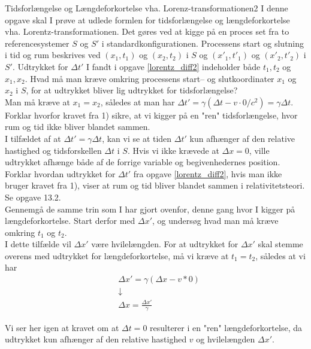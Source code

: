 \begin{opgave}{Tidsforlængelse og Længdeforkortelse vha. Lorenz-transformationen}{2}
	I denne opgave skal I prøve at udlede formlen for tidsforlængelse og længdeforkortelse vha. Lorentz-transformationen. Det gøres ved at kigge på en proces set fra to referencesystemer $S$ og $S'$ i standardkonfigurationen. Processens start og slutning i tid og rum beskrives ved $(x_1,t_1)$ og $(x_2,t_2)$ i $S$ og $(x'_1,t'_1)$ og $(x'_2,t'_2)$ i $S'$.
	\opg Udtrykket for $\Delta t'$ I fandt i opgave \ref{lorentz_diff2} indeholder både $t_1,t_2$ og $x_1,x_2$. Hvad må man kræve omkring processens start-- og slutkoordinater $x_1$ og $x_2$ i $S$, for at udtrykket bliver lig udtrykket for tidsforlængelse?\\
	
	Man må kræve at $x_1=x_2$, således at man har $\Delta t'=\gamma(\Delta t-v \cdot 0/c^2)=\gamma\Delta t$.\\
	\opg Forklar hvorfor kravet fra 1) sikre, at vi kigger på en "ren" tidsforlængelse, hvor rum og tid ikke bliver blandet sammen.\\
	
	I tilfældet af at $\Delta t' =\gamma\Delta t$, kan vi se at tiden $\Delta t'$ kun afhænger af den relative hastighed og tidsforskellen $\Delta t$ i $S$. Hvis vi ikke krævede at $\Delta x=0$, ville udtrykket afhænge både af de forrige variable og begivenhedernes position.\\
	\opg Forklar hvordan udtrykket for $\Delta t'$ fra opgave \ref{lorentz_diff2}, hvis man ikke bruger kravet fra 1), viser at rum og tid bliver blandet sammen i relativitetsteori.\\
	
	Se opgave 13.2.\\
	\opg Gennemgå de samme trin som I har gjort ovenfor, denne gang hvor I kigger på længdeforkortelse. Start derfor med $\Delta x'$, og undersøg hvad man må kræve omkring $t_1$ og $t_2$.\\
	
	I dette tilfælde vil $\Delta x'$ være hvilelængden. For at udtrykket for $\Delta x'$ skal stemme overens med udtrykket for længdeforkortelse, må vi kræve at $t_1=t_2$, således at vi har
	\begin{align*}
	&\Delta x'=\gamma(\Delta x-v*0) \\
	&\downarrow \\
	&\Delta x=\frac{\Delta x'}{\gamma}
	\end{align*}
	
	Vi ser her igen at kravet om at $\Delta t = 0$ resulterer i en "ren" længdeforkortelse, da udtrykket kun afhænger af den relative hastighed $v$ og hvilelængden $\Delta x'$.
\end{opgave}

